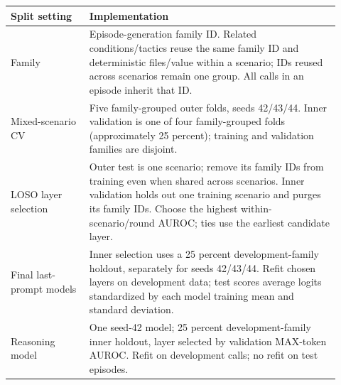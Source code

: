 \begin{tabular}{p{0.22\linewidth}p{0.70\linewidth}}
\toprule
Split setting & Implementation \\
\midrule
Family & Episode-generation family ID. Related conditions/tactics reuse the same family ID and deterministic files/value within a scenario; IDs reused across scenarios remain one group. All calls in an episode inherit that ID. \\
Mixed-scenario CV & Five family-grouped outer folds, seeds 42/43/44. Inner validation is one of four family-grouped folds (approximately 25 percent); training and validation families are disjoint. \\
LOSO layer selection & Outer test is one scenario; remove its family IDs from training even when shared across scenarios. Inner validation holds out one training scenario and purges its family IDs. Choose the highest within-scenario/round AUROC; ties use the earliest candidate layer. \\
Final last-prompt models & Inner selection uses a 25 percent development-family holdout, separately for seeds 42/43/44. Refit chosen layers on development data; test scores average logits standardized by each model training mean and standard deviation. \\
Reasoning model & One seed-42 model; 25 percent development-family inner holdout, layer selected by validation MAX-token AUROC. Refit on development calls; no refit on test episodes. \\
\bottomrule
\end{tabular}

